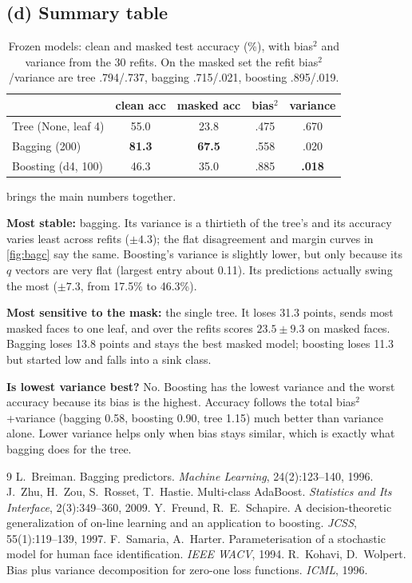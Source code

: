 \documentclass[10pt,twocolumn,letterpaper]{article}
\begin{document}
\subsection{(d) Summary table}
\begin{table}[h]
\centering\small
\begin{tabular}{lcccc}
\toprule
& clean acc & masked acc & bias$^2$ & variance\\
\midrule
Tree (None, leaf 4)   & 55.0 & 23.8 & .475 & .670\\
Bagging (200)         & \textbf{81.3} & \textbf{67.5} & .558 & .020\\
Boosting (d4, 100)    & 46.3 & 35.0 & .885 & \textbf{.018}\\
\bottomrule
\end{tabular}
\caption{Frozen models: clean and masked test accuracy (\%), with bias$^2$ and
variance from the 30 refits. On the masked set the refit bias$^2$/variance are
tree .794/.737, bagging .715/.021, boosting .895/.019.}
\label{tab:final}
\end{table}

 brings the main numbers together.

\textbf{Most stable:} bagging. Its variance is a thirtieth of the tree's and its
accuracy varies least across refits ($\pm4.3$); the flat disagreement and margin
curves in \cref{fig:bagc} say the same. Boosting's variance is slightly lower,
but only because its $q$ vectors are very flat (largest entry about 0.11). Its
predictions actually swing the most ($\pm7.3$, from 17.5\% to 46.3\%).

\textbf{Most sensitive to the mask:} the single tree. It loses 31.3 points,
sends most masked faces to one leaf, and over the refits scores
$23.5\pm9.3$ on masked faces. Bagging loses 13.8 points and stays the best
masked model; boosting loses 11.3 but started low and falls into a sink
class.

\textbf{Is lowest variance best?} No. Boosting has the lowest variance and the
worst accuracy because its bias is the highest. Accuracy follows the total
bias$^2$+variance (bagging 0.58, boosting 0.90, tree 1.15) much better than
variance alone. Lower variance helps only when bias stays similar, which is
exactly what bagging does for the tree.

{\small
\begin{thebibliography}{9}\setlength{\itemsep}{0pt}
 L.~Breiman. Bagging predictors. \emph{Machine Learning}, 24(2):123--140, 1996.
 J.~Zhu, H.~Zou, S.~Rosset, T.~Hastie. Multi-class AdaBoost. \emph{Statistics and Its Interface}, 2(3):349--360, 2009.
 Y.~Freund, R.~E.~Schapire. A decision-theoretic generalization of on-line learning and an application to boosting. \emph{JCSS}, 55(1):119--139, 1997.
 F.~Samaria, A.~Harter. Parameterisation of a stochastic model for human face identification. \emph{IEEE WACV}, 1994.
 R.~Kohavi, D.~Wolpert. Bias plus variance decomposition for zero-one loss functions. \emph{ICML}, 1996.
\end{thebibliography}}
\end{document}
